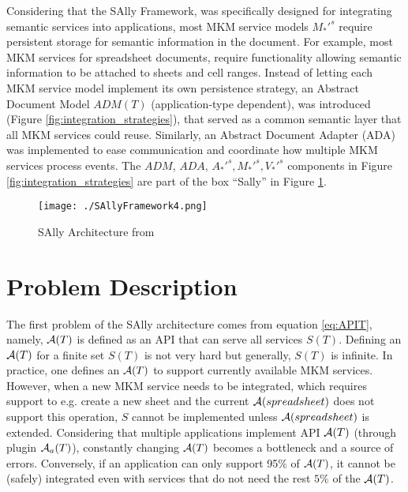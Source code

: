 \documentclass{llncs}
\begin{document}
Considering that the SAlly Framework, was specifically designed for integrating semantic services into applications, most MKM service models $M_{*}'^s$ require persistent storage for semantic information in the document. For example, most MKM services for spreadsheet documents, require functionality allowing semantic information to be attached to sheets and cell ranges. Instead of letting each MKM service model implement its own persistence strategy, an Abstract Document Model $ADM(T)$ (application-type dependent), was introduced (Figure \ref{fig:integration_strategies}), that served as a common semantic layer that all MKM services could reuse. Similarly, an Abstract Document Adapter (ADA) was implemented to ease communication and coordinate how multiple MKM services process events. The $ADM$, $ADA$, $A_{*}'^s, M_{*}'^s, V_{*}'^s$ components in Figure \ref{fig:integration_strategies} are part of the box ``Sally'' in Figure \ref{fig:sally_arch}.

\begin{figure}
\centering
\texttt{[image: ./SAllyFramework4.png]}
\caption{SAlly Architecture from \cite{DavJucKoh:safusa12}}
\label{fig:sally_arch}
\end{figure}

\section{Problem Description}
\label{problem_desc}


The first problem of the SAlly architecture comes from equation \ref{eq:APIT}, namely, $\mathcal{A}(T)$ is defined as an API that can serve all services $S(T)$. Defining an $\mathcal{A}(T)$ for a finite set $S(T)$ is not very hard but generally, $S(T)$ is infinite. In practice, one defines an $\mathcal{A}(T)$ to support currently available MKM services. However, when a new MKM service needs to be integrated, which requires support to e.g. create a new sheet and the current $\mathcal{A}(spreadsheet)$ does not support this operation, $S$ cannot be implemented unless $\mathcal{A}(spreadsheet)$ is extended. Considering that multiple applications implement API $\mathcal{A}(T)$ (through plugin $\mathcal{A}_a(T)$), constantly changing $\mathcal{A}(T)$ becomes a bottleneck and a source of errors. Conversely, if an application can only support 95\% of $\mathcal{A}(T)$, it cannot be (safely) integrated even with services that do not need the rest $5\%$ of the $\mathcal{A}(T)$. 
\end{document}
